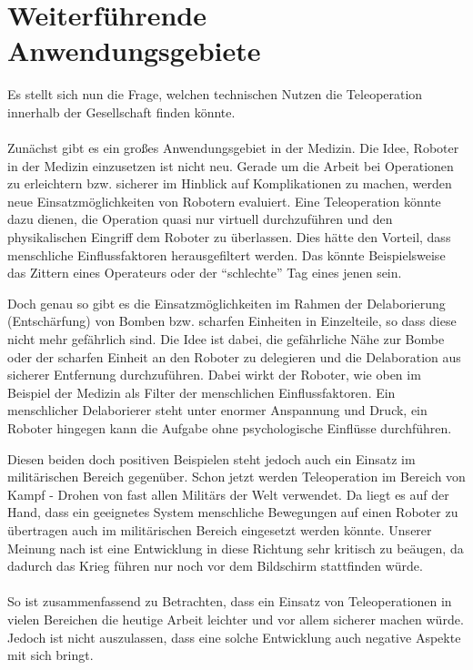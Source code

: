 \section{Weiterführende Anwendungsgebiete}
Es stellt sich nun die Frage, welchen technischen Nutzen die Teleoperation innerhalb der Gesellschaft finden könnte.
\\
\\
\noindent
Zunächst gibt es ein großes Anwendungsgebiet in der Medizin. Die Idee, Roboter in der Medizin einzusetzen ist nicht neu. Gerade um die Arbeit bei Operationen zu erleichtern bzw. sicherer im Hinblick auf Komplikationen zu machen, werden neue Einsatzmöglichkeiten von Robotern evaluiert. Eine Teleoperation könnte dazu dienen, die Operation quasi nur virtuell durchzuführen und den physikalischen Eingriff dem Roboter zu überlassen. Dies hätte den Vorteil, dass menschliche Einflussfaktoren herausgefiltert werden. Das könnte Beispielsweise das Zittern eines Operateurs oder der "`schlechte"' Tag eines jenen sein.

Doch genau so gibt es die Einsatzmöglichkeiten im Rahmen der Delaborierung (Entschärfung) von Bomben bzw. scharfen Einheiten in Einzelteile, so dass diese nicht mehr gefährlich sind. Die Idee ist dabei, die gefährliche Nähe zur Bombe oder der scharfen Einheit an den Roboter zu delegieren und die Delaboration aus sicherer Entfernung durchzuführen. Dabei wirkt der Roboter, wie oben im Beispiel der Medizin als Filter der menschlichen Einflussfaktoren. Ein menschlicher Delaborierer steht unter enormer Anspannung und Druck, ein Roboter hingegen kann die Aufgabe ohne psychologische Einflüsse durchführen. 

Diesen beiden doch positiven Beispielen steht jedoch auch ein Einsatz im militärischen Bereich gegenüber. Schon jetzt werden Teleoperation im Bereich von Kampf - Drohen von fast allen Militärs der Welt verwendet. Da liegt es auf der Hand, dass ein geeignetes System menschliche Bewegungen auf einen Roboter zu übertragen auch im militärischen Bereich eingesetzt werden könnte. Unserer Meinung nach ist eine Entwicklung in diese Richtung sehr kritisch zu beäugen, da dadurch das Krieg führen nur noch vor dem Bildschirm stattfinden würde.
\\
\\
\noindent
So ist zusammenfassend zu Betrachten, dass ein Einsatz von Teleoperationen in vielen Bereichen die heutige Arbeit leichter und vor allem sicherer machen würde. Jedoch ist nicht auszulassen, dass eine solche Entwicklung auch negative Aspekte mit sich bringt.


